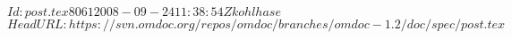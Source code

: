 \svnInfo $Id: post.tex 8061 2008-09-24 11:38:54Z kohlhase $
\svnKeyword $HeadURL: https://svn.omdoc.org/repos/omdoc/branches/omdoc-1.2/doc/spec/post.tex $

 
\newpage
{\small\printindex}


